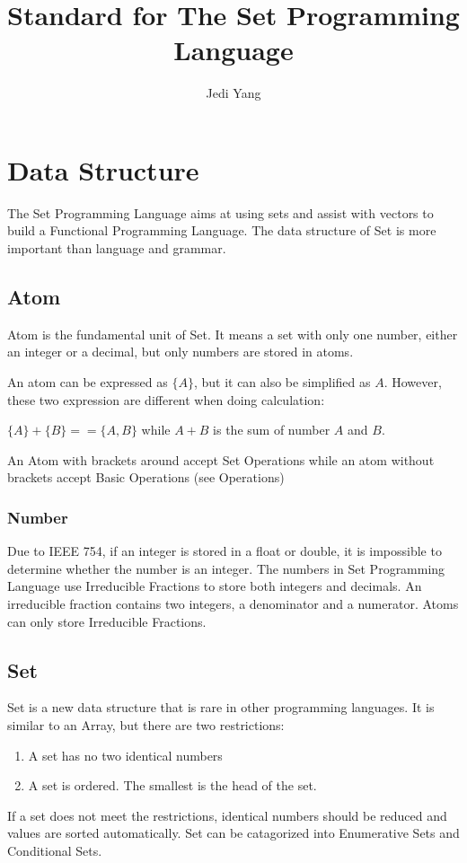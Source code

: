 \documentclass[12pt, a4paper]{IEEEtran}
\title{Standard for The Set Programming Language}
\author{Jedi Yang}
\begin{document}
\maketitle

\section{Data Structure}
	The Set Programming Language aims at using sets and assist with vectors to build a Functional Programming Language. The data structure of Set is more important than language and grammar.

\subsection{Atom}
	Atom is the fundamental unit of Set. It means a set with only one number, either an integer or a decimal, but only numbers are stored in atoms.
	
	An atom can be expressed as $\{A\}$, but it can also be simplified as $A$. However, these two expression are different when doing calculation:
	
	$\{A\} + \{B\} == \{A, B\}$ while $A + B$ is the sum of number $A$ and $B$.
	
	An Atom with brackets around accept Set Operations while an atom without brackets accept Basic Operations (see Operations)
	
	\subsubsection{Number}
	Due to IEEE 754, if an integer is stored in a float or double, it is impossible to determine whether the number is an integer. The numbers in Set Programming Language use Irreducible Fractions to store both integers and decimals. An irreducible fraction contains two integers, a denominator and a numerator. Atoms can only store Irreducible Fractions.

\subsection{Set}
	Set is a new data structure that is rare in other programming languages. It is similar to an Array, but there are two restrictions:
	\begin{enumerate}
	\item A set has no two identical numbers
	\item A set is ordered. The smallest is the head of the set.
	\end{enumerate}
	If a set does not meet the restrictions, identical numbers should be reduced and values are sorted automatically. Set can be catagorized into Enumerative Sets and Conditional Sets.
	
\end{document}
